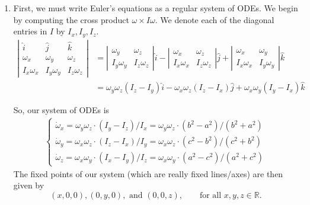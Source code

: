 \documentclass[10pt,letterpaper]{report}
\newcommand{\R}{\mathbb{R}}
\begin{document}
\begin{enumerate}
\begin{enumerate}
    \item First, we must write Euler's equations as a regular system of ODEs. We begin by computing the cross product $\omega \times I\omega$. We denote each of the diagonal entries in $I$ by $I_x, I_y, I_z$.
    \begin{align*}
        \left|\begin{array}{ccc}
            \hat i & \hat j & \hat k \\
            \omega_x & \omega_y & \omega_z \\
            I_x\omega_x & I_y\omega_y & I_z\omega_z
        \end{array}\right|
        &= 
        \left|\begin{array}{cc}
            \omega_y & \omega_z \\
            I_y\omega_y & I_z\omega_z 
        \end{array}\right| \hat i
        -
        \left|\begin{array}{cc}
            \omega_x & \omega_z \\
            I_x\omega_x & I_z\omega_z 
        \end{array}\right| \hat j
        +
        \left|\begin{array}{cc}
            \omega_x & \omega_y \\
            I_x\omega_x & I_y\omega_y
        \end{array}\right| \hat k
        \\
        &=
        \omega_y\omega_z(I_z - I_y) \hat i - \omega_x\omega_z(I_z - I_x) \hat j + \omega_x\omega_y(I_y - I_x) \hat k
    \end{align*}
    
    So, our system of ODEs is
    \begin{align*}
        \begin{cases}
        \dot\omega_x = \omega_y\omega_z\cdot (I_y-I_z)/I_x = \omega_y\omega_z\cdot (b^2-a^2)/(b^2+a^2) \\
        \dot\omega_y = \omega_x\omega_z\cdot (I_z-I_x)/I_y = \omega_x\omega_z\cdot (c^2-b^2)/(c^2+b^2) \\
        \dot\omega_z = \omega_x\omega_y\cdot (I_x-I_y)/I_z = \omega_x\omega_y\cdot (a^2-c^2)/(a^2+c^2)
        \end{cases}
    \end{align*}
    The fixed points of our system (which are really fixed lines/axes) are then given by
    \[
    (x, 0, 0), (0, y, 0), \textrm{ and } (0, 0, z), \qquad \textrm{for all } x,y,z \in \R.
    \]
    

\end{enumerate}
\end{enumerate}
\end{document}
